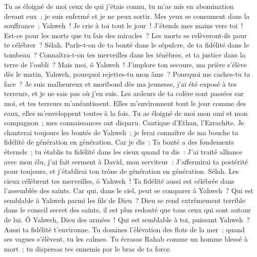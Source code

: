 \begin{multicols}{2}
Tu as éloigné de moi ceux de qui j'étais connu, tu m'as mis en abomination devant eux~; je suis enfermé et je ne peux sortir.
Mes yeux se consument dans la souffrance~; Yahweh~! Je crie à toi tout le jour~! J'étends mes mains vers toi~!
Est-ce pour les morts que tu fais des miracles~? Les morts se relèveront-ils pour te célébrer~? Sélah.
Parle-t-on de ta bonté dans le sépulcre, de ta fidélité dans le tombeau~?
Connaîtra-t-on tes merveilles dans les ténèbres, et ta justice dans la terre de l'oubli~?
Mais moi, ô Yahweh~! J'implore ton secours, ma prière s'élève dès le matin.
Yahweh, pourquoi rejettes-tu mon âme~? Pourquoi me caches-tu ta face~?
Je suis malheureux et moribond dès ma jeunesse, j'ai été exposé à tes terreurs, et je ne sais pas où j'en suis.
Les ardeurs de ta colère sont passées sur moi, et tes terreurs m'anéantissent.
Elles m'environnent tout le jour comme des eaux, elles m'enveloppent toutes à la fois.
Tu as éloigné de moi mon ami et mon compagnon~; mes connaissances ont disparu.
\VerseOne{}Cantique d'Ethan, l'Ezrachite.
Je chanterai toujours les bontés de Yahweh~; je ferai connaître de ma bouche ta fidélité de génération en génération.
Car je dis~: Ta bonté a des fondements éternels~; tu établis ta fidélité dans les cieux quand tu dis~:
J'ai traité alliance avec mon élu, j'ai fait serment à David, mon serviteur~:
J'affermirai ta postérité pour toujours, et j'établirai ton trône de génération en génération. Sélah.
Les cieux célèbrent tes merveilles, ô Yahweh~! Ta fidélité aussi est célébrée dans l'assemblée des saints.
Car qui, dans le ciel, peut se comparer à Yahweh~? Qui est semblable à Yahweh parmi les fils de Dieu~?
Dieu se rend extrêmement terrible dans le conseil secret des saints, il est plus redouté que tous ceux qui sont autour de lui.
Ô Yahweh, Dieu des armées~! Qui est semblable à toi, puissant Yahweh~? Aussi ta fidélité t'environne.
Tu domines l'élévation des flots de la mer~; quand ses vagues s'élèvent, tu les calmes.
Tu écrasas Rahab comme un homme blessé à mort~; tu dispersas tes ennemis par le bras de ta force.

\end{multicols}
